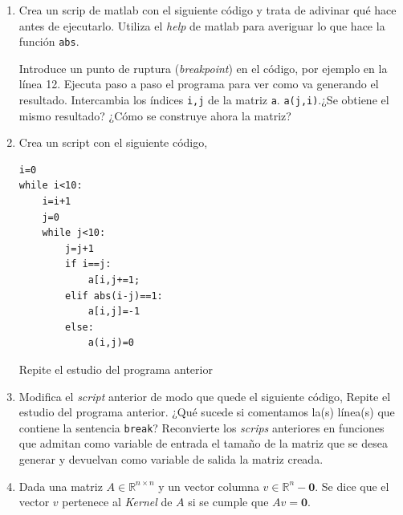 \begin{enumerate}
\item Crea un scrip de matlab con el siguiente código y trata de adivinar qué hace antes de ejecutarlo. Utiliza el \emph{help} de matlab para averiguar lo que hace la función \verb|abs|.

Introduce un punto de ruptura (\emph{breakpoint}) en el código, por ejemplo en la línea 12. Ejecuta paso a paso el programa para ver como va generando el resultado. Intercambia los índices \verb|i,j| de la matriz \verb|a|. \verb|a(j,i)|.¿Se obtiene el mismo resultado? ¿Cómo se construye ahora la matriz?

\item Crea un script con el siguiente código,
\begin{verbatim}
i=0
while i<10:
    i=i+1
    j=0
    while j<10:
        j=j+1
        if i==j:
            a[i,j+=1;
        elif abs(i-j)==1:
            a[i,j]=-1
        else:
            a(i,j)=0
\end{verbatim}

Repite el estudio del programa anterior

\item Modifica el \emph{script} anterior de modo que quede el siguiente código,
Repite el estudio del programa anterior. ¿Qué sucede si comentamos la(s) línea(s) que contiene la sentencia \verb|break|?
Reconvierte los \emph{scrips} anteriores en funciones que admitan como variable de entrada el tamaño de la matriz que se desea generar y devuelvan como variable de salida la matriz creada.

\item Dada una matriz $A \in \mathbb{R}^{n\times n}$ y un vector columna $v \in \mathbb{R}^n-{\mathbf{0}}$. Se dice que el vector $v$ pertenece al \emph{Kernel} de $A$ si se cumple que $Av =\mathbf{0}$.




\end{enumerate}
